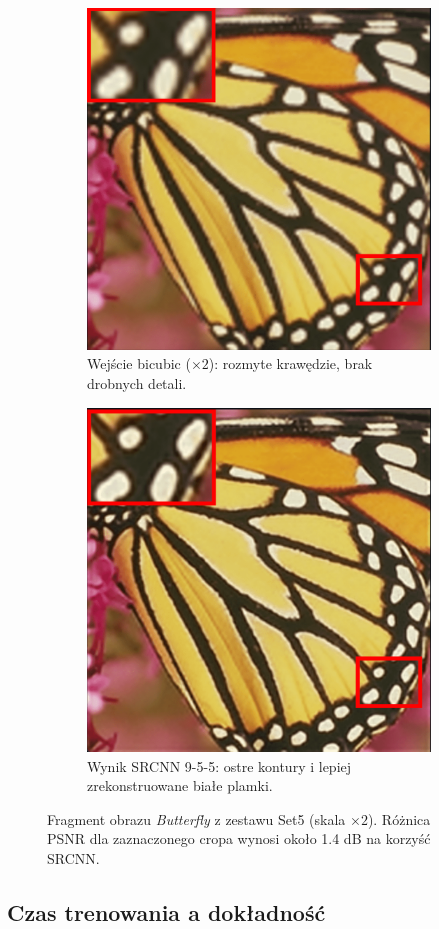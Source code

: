 \documentclass[11pt]{article}
\begin{document}
\begin{figure}[H]
\centering
\captionsetup[subfigure]{justification=centering}

\begin{subfigure}{\linewidth}
  \centering
  \includegraphics[width=.50\linewidth]{images/test1.png}  %
  \caption{Wejście bicubic ($\times2$): rozmyte krawędzie, brak drobnych detali.}
\end{subfigure}

\medskip  %

\begin{subfigure}{\linewidth}
  \centering
  \includegraphics[width=.50\linewidth]{images/output1.png}  %
  \caption{Wynik SRCNN 9-5-5: ostre kontury i lepiej zrekonstruowane białe plamki.}
\end{subfigure}

\caption{Fragment obrazu \emph{Butterfly} z zestawu Set5 (skala $\times2$).  
Różnica PSNR dla zaznaczonego cropa wynosi około 1.4 dB na korzyść SRCNN.}
\label{fig:vis_butterfly}
\end{figure}
\subsection{Czas trenowania a dokładność}
\end{document}
